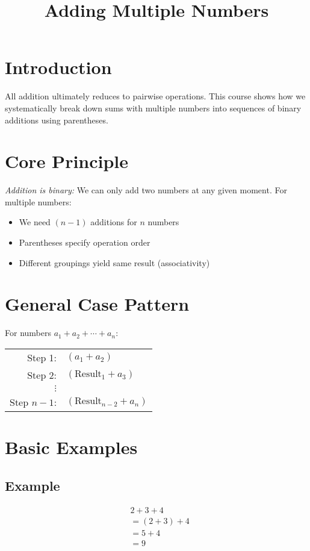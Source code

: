 \documentclass{article}
\title{Adding Multiple Numbers}
\begin{document}
\maketitle

\section{Introduction}
All addition ultimately reduces to pairwise operations. This course shows how we systematically break down sums with multiple numbers into sequences of binary additions using parentheses.

\section{Core Principle}
\emph{Addition is binary:} We can only add two numbers at any given moment. For multiple numbers:
\begin{itemize}
    \item We need $(n-1)$ additions for $n$ numbers
    \item Parentheses specify operation order
    \item Different groupings yield same result (associativity)
\end{itemize}

\section{General Case Pattern}

For numbers $a_1 + a_2 + \cdots + a_n$:

\renewcommand{\arraystretch}{1.5}
\begin{tabular}{rl}
    Step 1:     & $(a_1 + a_2)$                 \\
    Step 2:     & $(\text{Result}_1 + a_3)$     \\
    $\vdots$    &                               \\
    Step $n-1$: & $(\text{Result}_{n-2} + a_n)$ \\
\end{tabular}

\section{Basic Examples}

\subsection{Example}
\begin{align*}
     & 2 + 3 + 4     \\
     & = (2 + 3) + 4 \\
     & = 5 + 4       \\
     & = 9
\end{align*}
\end{document}
